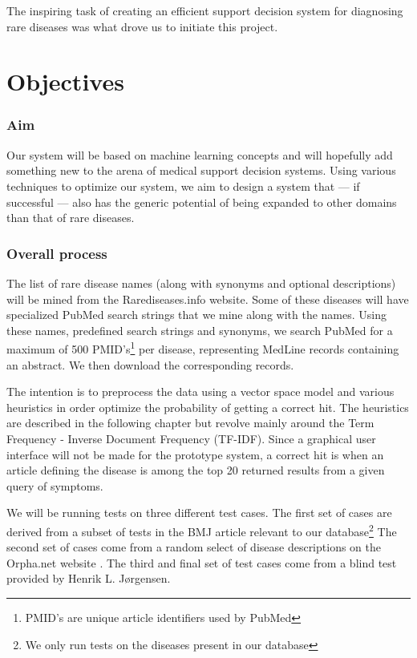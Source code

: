 The inspiring task of creating an efficient support decision
system for diagnosing rare diseases was what drove us to initiate this
project.

\section{Objectives}

\subsubsection{Aim}
Our system will be based on machine learning concepts and will
hopefully add something new to the arena of medical support decision
systems. Using various techniques to optimize our system, we aim to
design a system that --- if successful --- also has the generic potential of
being expanded to other domains than that of rare diseases.

\subsubsection{Overall process}
The list of rare disease names (along with synonyms and optional
descriptions) will be mined from the Rarediseases.info website. Some
of these diseases will have specialized PubMed search strings that we
mine along with the names. Using these names, predefined search
strings and synonyms, we search PubMed for a maximum of 500
PMID's\footnote{PMID's are unique article identifiers used by PubMed}
per disease, representing MedLine records containing an abstract. We
then download the corresponding records.

The intention is to preprocess the data using a vector space model and
various heuristics in order optimize the probability of getting a correct
hit. The heuristics are described in the following chapter but
revolve mainly around the Term Frequency - Inverse Document Frequency
(TF-IDF). Since a graphical user interface will not be made for the
prototype system, a correct hit is when an article defining the disease
is among the top 20 returned results from a given query of
symptoms.

We will be running tests on three different test cases. The first set
of cases are derived from a subset of tests in the BMJ article
\cite{HangwiTang11102006} relevant to our database\footnote{We only
  run tests on the diseases present in our database} The second set of
cases come from a random select of disease descriptions on the
Orpha.net website \cite{Orphanet}. The third and final set of test
cases come from a blind test provided by Henrik L. J\o rgensen.

